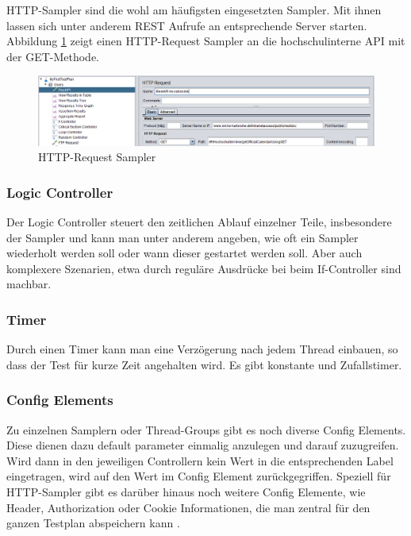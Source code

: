 \documentclass[a4paper,12pt]{article}
\begin{document}
HTTP-Sampler sind die wohl am häufigsten eingesetzten Sampler. Mit ihnen lassen sich unter anderem REST Aufrufe an entsprechende Server starten. Abbildung \ref{fig:http_request_sampler} zeigt einen HTTP-Request Sampler an die hochschulinterne API mit der GET-Methode.

\begin{figure}[htb]%
 \centering
    \includegraphics[width=1\textwidth]{bilder/http_request_sampler.png}
  \caption{HTTP-Request Sampler}
  \label{fig:http_request_sampler}
\end{figure}

\subsubsection{Logic Controller}
Der Logic Controller steuert den zeitlichen Ablauf einzelner Teile, insbesondere der Sampler und kann man unter anderem angeben, wie oft ein Sampler wiederholt werden soll oder wann dieser gestartet werden soll. Aber auch komplexere Szenarien, etwa durch reguläre Ausdrücke bei beim If-Controller sind machbar.

\subsubsection{Timer}
Durch einen Timer kann man eine Verzögerung nach jedem Thread einbauen, so dass der Test für kurze Zeit angehalten wird. Es gibt konstante und Zufallstimer.

\subsubsection{Config Elements}
Zu einzelnen Samplern oder Thread-Groups gibt es noch diverse Config Elements. Diese dienen dazu default parameter einmalig anzulegen und darauf zuzugreifen. Wird dann in den jeweiligen Controllern kein Wert in die entsprechenden Label eingetragen, wird auf den Wert im Config Element zurückgegriffen. Speziell für HTTP-Sampler gibt es darüber hinaus noch weitere Config Elemente, wie Header, Authorization oder Cookie Informationen, die man zentral für den ganzen Testplan abspeichern kann \cite{online:performanceTools}.
\end{document}

